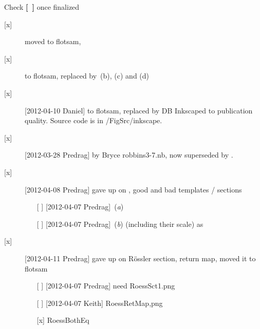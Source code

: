 Check {\bf [~]} once finalized
\begin{description}

\item[{[x]}] moved  to flotsam,
\item[{[x]}]  to flotsam, replaced by
             \,(b), (c) and (d)
\item[{[x]}] [2012-04-10 Daniel]   to flotsam, replaced by
             DB Inkscaped  to
             publication quality. Source code is in /FigSrc/inkscape.

\item[{[x]}] [2012-03-28 Predrag]
         by Bryce robbins3-7.nb, now superseded by
        .

\item[{[x]}] [2012-04-08 Predrag] gave up on ,
    good and bad templates / sections
    \begin{itemize}
        \item[{[ ]}] [2012-04-07 Predrag] \,({\it a})
        \item[{[ ]}] [2012-04-07 Predrag] \,({\it b})
            (including their scale) as
    \end{itemize}

\item[{[x]}] [2012-04-11 Predrag]  gave up on 
    R\"ossler section, return map, moved it to flotsam
    \begin{itemize}
        \item[{[ ]}] [2012-04-07 Predrag] need {RoessSct1}.png
        \item[{[ ]}] [2012-04-07 Keith] {RoessRetMap},png
        \item[{[x]}]  RoessBothEq
    \end{itemize}


\end{description}

